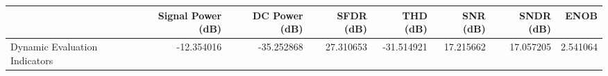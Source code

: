 \begin{tabular}{lrrrrrrr}
\toprule
{} &  Signal Power (dB) &  DC Power (dB) &  SFDR (dB) &   THD (dB) &   SNR (dB) &  SNDR (dB) &      ENOB \\
\midrule
Dynamic Evaluation Indicators &         -12.354016 &     -35.252868 &  27.310653 & -31.514921 &  17.215662 &  17.057205 &  2.541064 \\
\bottomrule
\end{tabular}
